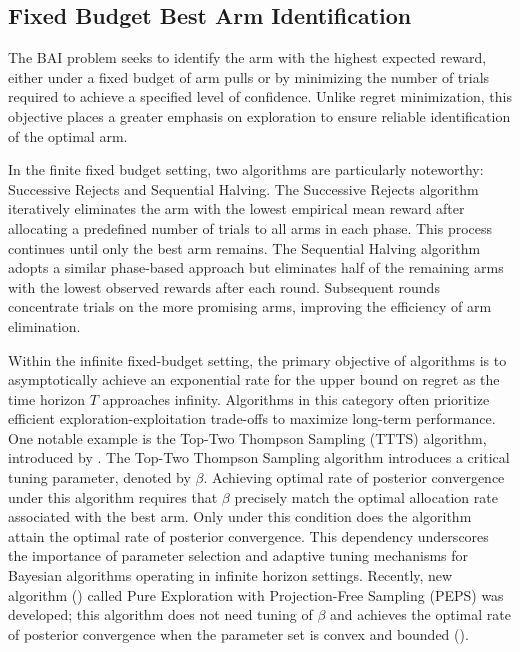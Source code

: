 \documentclass[accepted]{uai2025} %
\theoremstyle{plain}
\theoremstyle{definition}
\theoremstyle{remark}
\begin{document}
\subsection{Fixed Budget Best Arm Identification}\vspace{-.1in}

The BAI problem seeks to identify the arm with the highest expected reward, either under a fixed budget of arm pulls or by minimizing the number of trials required to achieve a specified level of confidence. Unlike regret minimization, this objective places a greater emphasis on exploration to ensure reliable identification of the optimal arm.

In the finite fixed budget setting, two algorithms are particularly noteworthy: Successive Rejects and Sequential Halving. The Successive Rejects algorithm \cite{audibert2010best} iteratively eliminates the arm with the lowest empirical mean reward after allocating a predefined number of trials to all arms in each phase. This process continues until only the best arm remains. The Sequential Halving algorithm \cite{karnin2013almost} adopts a similar phase-based approach but eliminates half of the remaining arms with the lowest observed rewards after each round. Subsequent rounds concentrate trials on the more promising arms, improving the efficiency of arm elimination.

Within the infinite fixed-budget setting, the primary objective of algorithms is to asymptotically achieve an exponential rate for the upper bound on regret as the time horizon $T$ approaches infinity. Algorithms in this category often prioritize efficient exploration-exploitation trade-offs to maximize long-term performance. One notable example is the Top-Two Thompson Sampling (TTTS) algorithm, introduced by \citet{russo2016simple}. The Top-Two Thompson Sampling algorithm introduces a critical tuning parameter, denoted by $\beta$. Achieving optimal rate of posterior convergence under this algorithm requires that $\beta$ precisely match the optimal allocation rate associated with the best arm. Only under this condition does the algorithm attain the optimal rate of posterior convergence. This dependency underscores the importance of parameter selection and adaptive tuning mechanisms for Bayesian algorithms operating in infinite horizon settings. Recently, new algorithm (\cite{li2024optimal}) called Pure Exploration with Projection-Free Sampling (PEPS) was developed; this algorithm does not need tuning of $\beta$ and achieves the optimal rate of posterior convergence when the parameter set is convex and bounded (\cite{kone2024pareto}).
\end{document}
